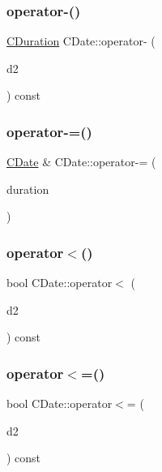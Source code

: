 \subsubsection{\texorpdfstring{operator-\/()}{operator-()}\hspace{0.1cm}{\footnotesize\ttfamily [2/2]}}
{\footnotesize\ttfamily \mbox{\hyperlink{class_c_duration}{C\+Duration}} C\+Date\+::operator-\/ (\begin{DoxyParamCaption}\item[{const \mbox{\hyperlink{class_c_date}{C\+Date}} \&}]{d2 }\end{DoxyParamCaption}) const}

\mbox{\label{class_c_date_a42abd6ced54a740fa4f4d90c81845e0c}} 
\subsubsection{\texorpdfstring{operator-\/=()}{operator-=()}}
{\footnotesize\ttfamily \mbox{\hyperlink{class_c_date}{C\+Date}} \& C\+Date\+::operator-\/= (\begin{DoxyParamCaption}\item[{const \mbox{\hyperlink{class_c_duration}{C\+Duration}} \&}]{duration }\end{DoxyParamCaption})}

\mbox{\label{class_c_date_a8a2db90f7b10e1bfc6a9075303721b00}} 
\subsubsection{\texorpdfstring{operator$<$()}{operator<()}}
{\footnotesize\ttfamily bool C\+Date\+::operator$<$ (\begin{DoxyParamCaption}\item[{const \mbox{\hyperlink{class_c_date}{C\+Date}} \&}]{d2 }\end{DoxyParamCaption}) const}

\mbox{\label{class_c_date_a4ef63cc76ace80f69dc86b2e9f64e4b8}} 
\subsubsection{\texorpdfstring{operator$<$=()}{operator<=()}}
{\footnotesize\ttfamily bool C\+Date\+::operator$<$= (\begin{DoxyParamCaption}\item[{const \mbox{\hyperlink{class_c_date}{C\+Date}} \&}]{d2 }\end{DoxyParamCaption}) const}

